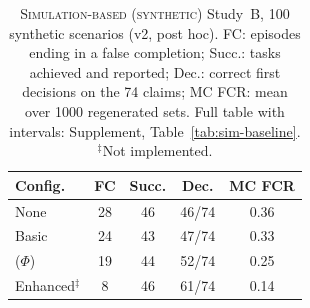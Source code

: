 \begin{table}[t]
\centering
\caption{\textsc{Simulation-based (synthetic)} Study~B, 100 synthetic scenarios (v2, post hoc). FC: episodes ending in a false completion; Succ.: tasks achieved and reported; Dec.: correct first decisions on the 74 claims; MC FCR: mean over 1000 regenerated sets. Full table with intervals: Supplement, Table~\ref{tab:sim-baseline}. $^{\ddagger}$Not implemented.}
\label{tab:sim-baseline-short}
\scriptsize
\setlength{\tabcolsep}{4pt}
\begin{tabular}{@{}lcccc@{}}
\toprule
Config. & FC & Succ. & Dec. & MC FCR \\
\midrule
None & 28 & 46 & 46/74 & 0.36 \\
Basic & 24 & 43 & 47/74 & 0.33 \\
($\Phi$) & 19 & 44 & 52/74 & 0.25 \\
Enhanced$^{\ddagger}$ & 8 & 46 & 61/74 & 0.14 \\
\bottomrule
\end{tabular}
\end{table}
